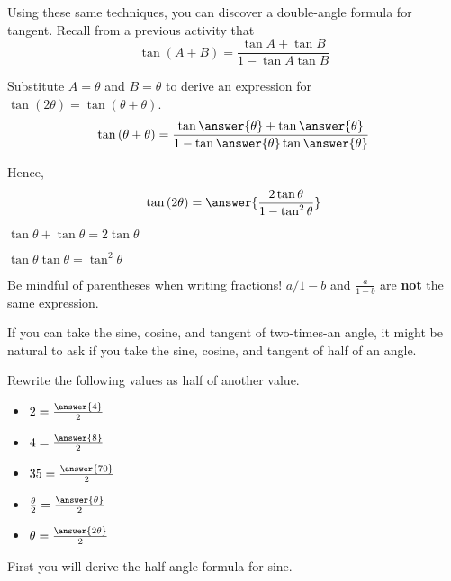 \documentclass[numbers]{ximera}
\begin{document}

Using these same techniques, you can discover a double-angle formula for tangent.
Recall from a previous activity that
\[\tan \left(A+B\right) = \displaystyle{\frac{\tan A + \tan B}{1-\tan A \tan B}}\]

\begin{problem}
Substitute $A=\theta$ and $B=\theta$ to derive an expression for $\tan\left(2\theta\right)=\tan\left(\theta+\theta\right)$.
\[\tan\left(\theta+\theta\right)=\frac{\tan\answer{\theta}+\tan\answer{\theta}}{1-\tan\answer{\theta}\tan\answer{\theta}}\]
\end{problem}

\begin{question}
Hence,
\[\tan\left(2\theta\right)=\answer{\frac{2\tan\theta}{1-\tan^2\theta}}\]
\begin{hint}
$\tan\theta+\tan\theta=2\tan\theta$
\end{hint}

\begin{hint}
$\tan\theta\tan\theta=\tan^2\theta$
\end{hint}

\begin{hint}
Be mindful of parentheses when writing fractions! $a/1-b$ and $\frac{a}{1-b}$ are {\bf not} the same expression.
\end{hint}
\end{question}

If you can take the sine, cosine, and tangent of two-times-an angle, it might be natural to ask if you take the sine, cosine, and tangent of half of an angle.

\begin{problem}
Rewrite the following values as half of another value.
\begin{itemize}
	\item $2=\frac{\answer{4}}{2}$
	\item $4=\frac{\answer{8}}{2}$
	\item $35=\frac{\answer{70}}{2}$
	\item $\frac{\theta}{2} = \frac{\answer{\theta}}{2}$
	\item $\theta=\frac{\answer{2\theta}}{2}$

\end{itemize}
\end{problem}

First you will derive the half-angle formula for sine.
\end{document}

